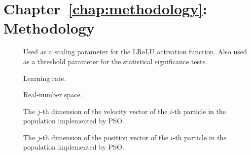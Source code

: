 \begin{description}
	\item [\parbox{2cm}{$h_{k}$}]
	\item [\parbox{2cm}{$i$}]
	\item [\parbox{2cm}{$I$}]
	\item [\parbox{2cm}{$j$}]
	\item [\parbox{2cm}{$J$}]
	\item [\parbox{2cm}{$K-1$}]
	\item [\parbox{2cm}{$k$}]
	\item [\parbox{2cm}{$K$}]
	\item [\parbox{2cm}{$L$}]
	\item [\parbox{2cm}{$LSE$}]
	\item [\parbox{2cm}{$Mult$}]
	\item [\parbox{2cm}{$N_{0,k}$}]
	\item [\parbox{2cm}{$N_{1,k}$}]
	\item [\parbox{2cm}{$N_{j,k}$}]
	\item [\parbox{2cm}{$N_{j}$}]
	\item [\parbox{2cm}{$N_{k}$}]
	\item [\parbox{2cm}{$N$}]
	\item [\parbox{2cm}{$S$}]
	\item [\parbox{2cm}{$t$}]
\end{description}

\section{Chapter~\ref{chap:methodology}: Methodology}
\label{sec:symbols:methodology}

\begin{description}
	\item [\parbox{2cm}{$\alpha$}] Used as a scaling parameter for the \acs{LReLU} activation function. Also used as a threshold parameter for the statistical significance tests.
	\item [\parbox{2cm}{$\eta$}] Learning rate.
	\item [\parbox{2cm}{$\mathbb{R}$}] Real-number space.
	\item [\parbox{2cm}{$v_{ij}$}] The $j$-th dimension of the velocity vector of the $i$-th particle in the population implemented by \acs{PSO}.
	\item [\parbox{2cm}{$x_{ij}$}] The $j$-th dimension of the position vector of the $i$-th particle in the population implemented by \acs{PSO}.
\end{description}

